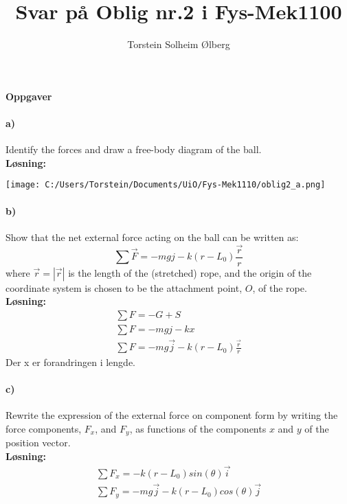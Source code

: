 \documentclass[11pt, A4paper,norsk]{article}
\author{Torstein Solheim Ølberg}
\title{Svar på Oblig nr.2 i Fys-Mek1100}
\begin{document}
\maketitle
	\begin{center}
\Large \textbf{Oppgaver}
	\end{center}
		\paragraph{a)}
			\begin{flushleft}
Identify the forces and draw a free-body diagram of the ball. \\
\vspace{1mm}
\textbf{Løsning:}
			\end{flushleft}
\texttt{[image: C:/Users/Torstein/Documents/UiO/Fys-Mek1110/oblig2\_a.png]}
		\paragraph{b)}
			\begin{flushleft}
Show that the net external force acting on the ball can be written as:
$$\sum \vec{F} = -mgj - k(r - L_{0})\frac{\vec{r}}{r}$$
where $\vec{r} = |\vec{r}|$ is the length of the (stretched) rope, and the origin of the coordinate system is chosen to be the attachment point, $O$, of the rope. \\
\vspace{1mm}
\textbf{Løsning:} \\
\vspace{1mm}
				\begin{align}
\sum F = - G + S \\
\sum F = -mgj - kx \\
\sum F = - mg\vec{j} - k(r - L_0)\frac{\vec{r}}{r}
				\end{align}
Der x er forandringen i lengde.
			\end{flushleft}
		\paragraph{c)}
			\begin{flushleft}
Rewrite the expression of the external force on component form by writing the
force components, $F_{x}$, and $F_{y}$, as functions of the components $x$ and $y$ of the
position vector. \\
\vspace{1mm}
\textbf{Løsning:} \\
\vspace{1mm}
				\begin{align}
\sum F_x = -k(r - L_0)sin(\theta)\vec{i} \\
\sum F_y = - mg\vec{j} - k(r - L_0)cos(\theta)\vec{j}
				\end{align}
			\end{flushleft}
\end{document}
